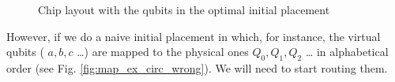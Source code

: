 \begin{enumerate}
\begin{figure}[H]
{
}
\caption{Chip layout with the qubits in the optimal initial placement}
\label{fig:optimal_init_place}
\end{figure}


However, if we do a naive initial placement in which, for instance, the virtual qubits ( \(a, b, c\) \ldots{}) are mapped to the physical ones \(Q_0, Q_1, Q_2\) \ldots{} in alphabetical order (see Fig. \ref{fig:map_ex_circ_wrong}).
We will need to start routing them.


\begin{figure}[H]
\centering


\end{figure}
\end{enumerate}
